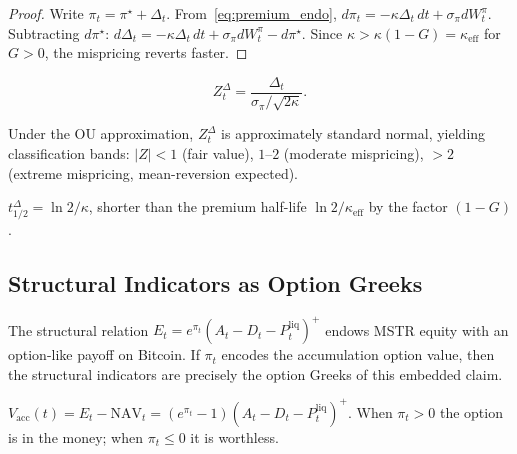 \begin{proof}
  Write $\pi_t = \pi^\star + \Delta_t$.  From~\eqref{eq:premium_endo},
  $d\pi_t = -\kappa\Delta_t\,dt + \sigma_\pi dW_t^\pi$.  Subtracting
  $d\pi^\star$: $d\Delta_t = -\kappa\Delta_t\,dt + \sigma_\pi dW_t^\pi
  - d\pi^\star$.  Since $\kappa > \kappa(1-G) = \kappa_{\mathrm{eff}}$
  for $G > 0$, the mispricing reverts faster.
\end{proof}

\begin{definition}
  \label{def:zscore}
  \begin{equation}
    \label{eq:zscore}
    Z_t^{\Delta} = \frac{\Delta_t}{\sigma_\pi / \sqrt{2\kappa}}.
  \end{equation}
\end{definition}

Under the OU approximation, $Z_t^\Delta$ is approximately standard normal,
yielding classification bands: $|Z| < 1$ (fair value), $1$--$2$ (moderate
mispricing), $> 2$ (extreme mispricing, mean-reversion expected).

\begin{proposition}
  \label{prop:halflife}
  $t_{1/2}^{\Delta} = \ln 2 / \kappa$, shorter than the premium half-life
  $\ln 2 / \kappa_{\mathrm{eff}}$ by the factor $(1-G)$.
\end{proposition}

\subsection{Structural Indicators as Option Greeks}\label{sec:greeks}

The structural relation $E_t = e^{\pi_t}(A_t - D_t - P_t^{\mathrm{liq}})^+$
endows MSTR equity with an option-like payoff on Bitcoin.  If $\pi_t$ encodes
the accumulation option value, then the structural indicators are precisely
the option Greeks of this embedded claim.

\begin{definition}
  \label{def:acc_option_greeks}
  $V_{\mathrm{acc}}(t) = E_t - \mathrm{NAV}_t = (e^{\pi_t} - 1)(A_t - D_t - P_t^{\mathrm{liq}})^+$.
  When $\pi_t > 0$ the option is in the money; when $\pi_t \le 0$ it is
  worthless.
\end{definition}

